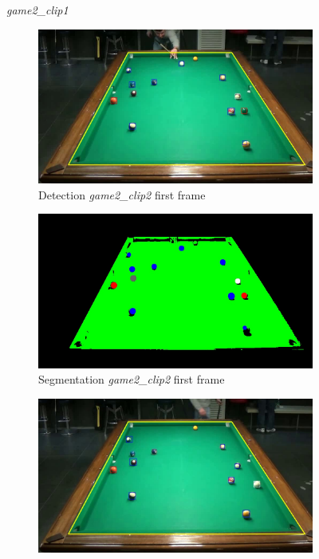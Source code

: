 \begin{figure}[H]
	\caption{\textit{game2\_clip1}}
\end{figure}


\begin{figure}[H]
	\centering
	\begin{subfigure}[b]{0.48\textwidth}
		\centering
		\includegraphics[width=\textwidth]{images/Detection/game2_clip2_detected_balls_first_frame.jpg}
		\caption{Detection \textit{game2\_clip2} first frame}
		\label{fig: game2_clip2_first_frame_detected}
	\end{subfigure}
	\begin{subfigure}[b]{0.48\textwidth}
		\centering
		\includegraphics[width=\textwidth]{images/Segmentation/game2_clip2_segmented_balls_first_frame.jpg}
		\caption{Segmentation \textit{game2\_clip2} first frame}
		\label{fig: game2_clip2_first_frame_segmented}
	\end{subfigure}
	\begin{subfigure}[b]{0.48\textwidth}
		\centering
		\includegraphics[width=\textwidth]{images/Detection/game2_clip2_detected_balls_last_frame.jpg}

\end{subfigure}
\end{figure}
